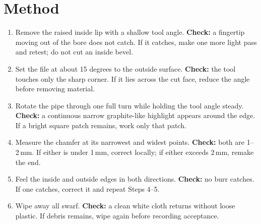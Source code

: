 \hfill
\begin{minipage}[t]{0.51\linewidth}
\vspace{0pt}
\begin{telosfacts}[0.22]
\end{telosfacts}
\end{minipage}

\section{Method}
\begin{enumerate}
\item Remove the raised inside lip with a shallow tool angle. \textbf{Check:}
a fingertip moving out of the bore does not catch. If it catches, make one more
light pass and retest; do not cut an inside bevel.
\item Set the file at about 15 degrees to the outside surface. \textbf{Check:}
the tool touches only the sharp corner. If it lies across the cut face, reduce
the angle before removing material.
\item Rotate the pipe through one full turn while holding the tool angle steady.
\textbf{Check:} a continuous narrow graphite-like highlight appears around the
edge. If a bright square patch remains, work only that patch.
\item Measure the chamfer at its narrowest and widest points. \textbf{Check:}
both are 1--2\,mm. If either is under 1\,mm, correct locally; if either exceeds
2\,mm, remake the end.
\item Feel the inside and outside edges in both directions. \textbf{Check:} no
burr catches. If one catches, correct it and repeat Steps 4--5.
\item Wipe away all swarf. \textbf{Check:} a clean white cloth returns without
loose plastic. If debris remains, wipe again before recording acceptance.
\end{enumerate}


